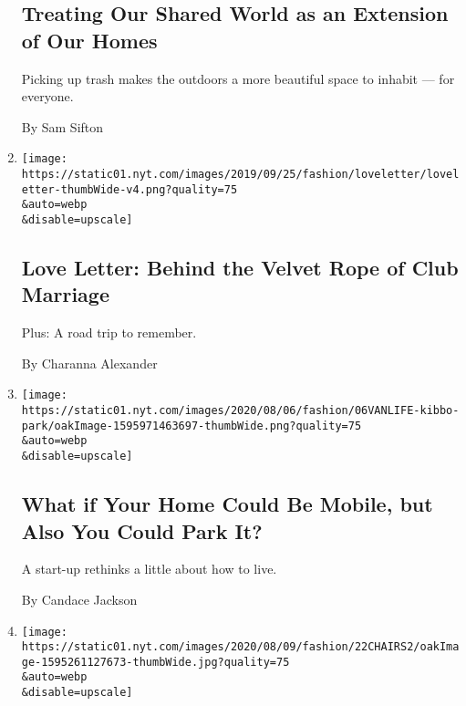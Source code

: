 \begin{enumerate}
{  \subsection{Treating Our Shared World as an Extension of Our
  Homes}\label{treating-our-shared-world-as-an-extension-of-our-homes}}

  Picking up trash makes the outdoors a more beautiful space to inhabit
  --- for everyone.

  By Sam Sifton
\item
  \href{/2020/08/07/style/love-letter-newsletter-behind-the-velvet-rope-of-club-marriage.html}{}

  \texttt{[image: https://static01.nyt.com/images/2019/09/25/fashion/loveletter/loveletter-thumbWide-v4.png?quality=75\\\&auto=webp\\\&disable=upscale]}

  \hypertarget{love-letter-behind-the-velvet-rope-of-club-marriage-1}{%
  \subsection{Love Letter: Behind the Velvet Rope of Club
  Marriage}\label{love-letter-behind-the-velvet-rope-of-club-marriage-1}}

  Plus: A road trip to remember.

  By Charanna Alexander
\item
  \href{/2020/08/07/style/kibbo-van-life-startup.html}{}

  \texttt{[image: https://static01.nyt.com/images/2020/08/06/fashion/06VANLIFE-kibbo-park/oakImage-1595971463697-thumbWide.png?quality=75\\\&auto=webp\\\&disable=upscale]}

  \hypertarget{what-if-your-home-could-be-mobile-but-also-you-could-park-it-1}{%
  \subsection{What if Your Home Could Be Mobile, but Also You Could Park
  It?}\label{what-if-your-home-could-be-mobile-but-also-you-could-park-it-1}}

  A start-up rethinks a little about how to live.

  By Candace Jackson
\item
  \href{/2020/08/07/style/gamer-chair-market-herman-miller.html}{}

  \texttt{[image: https://static01.nyt.com/images/2020/08/09/fashion/22CHAIRS2/oakImage-1595261127673-thumbWide.jpg?quality=75\\\&auto=webp\\\&disable=upscale]}


\end{enumerate}
